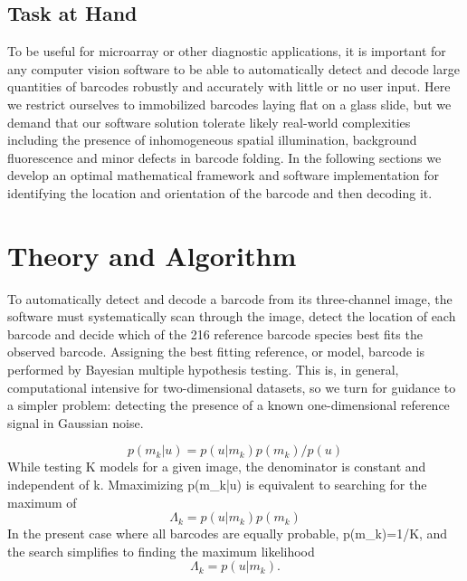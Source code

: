 \subsection{Task at Hand}
To be useful for microarray or other diagnostic applications, it is important for any computer vision software to be able to automatically detect and decode large quantities of barcodes robustly and accurately with little or no user input. 
Here we restrict ourselves to immobilized barcodes laying flat on a glass slide, but we demand that our software solution tolerate  likely real-world complexities including the presence of inhomogeneous spatial illumination, background fluorescence and minor defects in barcode folding.  
In the following sections we develop an optimal mathematical framework and software implementation for identifying the location and orientation of the barcode and then decoding it.


\section{Theory and Algorithm}
To automatically detect and decode a barcode from its three-channel image, the software must systematically scan through the image, detect the location of each barcode and decide which of the 216 reference barcode species best fits the observed barcode. Assigning the best fitting reference, or model, barcode is performed by Bayesian multiple hypothesis testing. This is, in general, computational intensive for two-dimensional datasets, so we turn for guidance to a simpler problem: detecting the presence of a known one-dimensional reference signal in Gaussian noise.








\begin{equation}
p(m_k|u) = p(u|m_k)p(m_k)/p(u)
\end{equation}
While testing K models for a given image, the denominator is constant and independent of k. Mmaximizing p(m_k|u) is equivalent to searching for the maximum of 
\begin{equation}
\Lambda_k = p(u|m_k)p(m_k)
\end{equation}
In the present case where all barcodes are equally probable,
 p(m_k)=1/K, 
and the search simplifies to finding the maximum likelihood 
\begin{equation}
\Lambda_k = p(u|m_k).
\end{equation}



